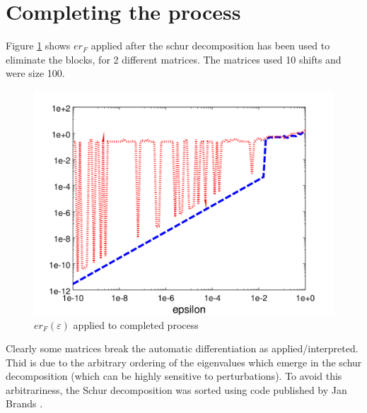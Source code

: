 \documentclass{article}
\newcommand{\e}{\varepsilon}
\begin{document}
\section{Completing the process}

Figure \ref{fig:vanErr} shows $er_F$ applied after the schur decomposition
has been used to eliminate the blocks, for 2 different matrices.
The matrices used 10 shifts and were size 100.

\begin{figure}[h!]
  \centering
  \includegraphics[width=.5\linewidth]{endVanillaError.png}
  \caption{$er_F(\e)$ applied to completed process}\label{fig:vanErr}
\end{figure}

Clearly some matrices break the automatic differentiation as applied/interpreted.
Thid is due to the arbitrary ordering of the eigenvalues which emerge
in the schur decomposition (which can be highly sensitive to perturbations).
To avoid this arbitrariness, the Schur decomposition was sorted using
code published by Jan Brands \cite{srschur}.


%
%
\end{document}
